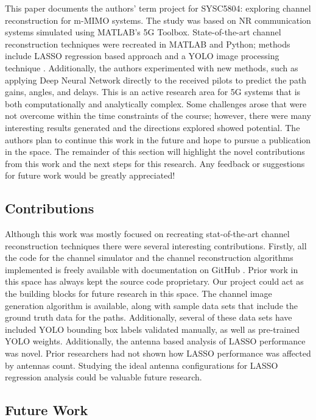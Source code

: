 This paper documents the authors' term project for SYSC5804: exploring channel reconstruction for m-MIMO systems. The study was based on NR communication systems simulated using MATLAB's 5G Toolbox. State-of-the-art channel reconstruction techniques were recreated in MATLAB and Python; methods include LASSO regression based approach \cite{Liu2016} and a YOLO image processing technique \cite{Li2020}. Additionally, the authors experimented with new methods, such as applying Deep Neural Network directly to the received pilots to predict the path gains, angles, and delays. This is an active research area for 5G systems that is both computationally and analytically complex. Some challenges arose that were not overcome within the time constraints of the course; however, there were many interesting results generated and the directions explored showed potential. The authors plan to continue this work in the future and hope to pursue a publication in the space. The remainder of this section will highlight the novel contributions from this work and the next steps for this research. Any feedback or suggestions for future work would be greatly appreciated! 

\subsection{Contributions}
Although this work was mostly focused on recreating stat-of-the-art channel reconstruction techniques there were several interesting contributions. Firstly, all the code for the channel simulator and the channel reconstruction algorithms implemented is freely available with documentation on GitHub \cite{git}. Prior work in this space has always kept the source code proprietary. Our project could act as the building blocks for future research in this space. The channel image generation algorithm is available, along with sample data sets that include the ground truth data for the paths. Additionally, several of these data sets have included YOLO bounding box labels validated manually, as well as pre-trained YOLO weights. Additionally, the antenna based analysis of LASSO performance was novel. Prior researchers had not shown how LASSO performance was affected by antennas count. Studying the ideal antenna configurations for LASSO regression analysis could be valuable future research.  

\subsection{Future Work} 

